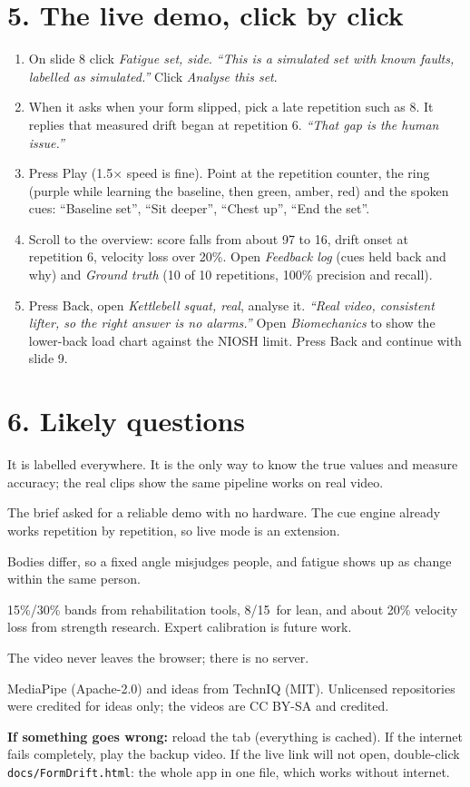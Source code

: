 \documentclass[11pt]{article}
\newcommand{\say}[1]{\textit{``#1''}}
\begin{document}
\section*{5. The live demo, click by click}

\begin{enumerate}
\item On slide 8 click \emph{Fatigue set, side}. \say{This is a simulated set with known faults, labelled as simulated.} Click \emph{Analyse this set}.
\item When it asks when your form slipped, pick a late repetition such as 8. It replies that measured drift began at repetition 6. \say{That gap is the human issue.}
\item Press Play (1.5$\times$ speed is fine). Point at the repetition counter, the ring (purple while learning the baseline, then green, amber, red) and the spoken cues: ``Baseline set'', ``Sit deeper'', ``Chest up'', ``End the set''.
\item Scroll to the overview: score falls from about 97 to 16, drift onset at repetition 6, velocity loss over 20\%. Open \emph{Feedback log} (cues held back and why) and \emph{Ground truth} (10 of 10 repetitions, 100\% precision and recall).
\item Press Back, open \emph{Kettlebell squat, real}, analyse it. \say{Real video, consistent lifter, so the right answer is no alarms.} Open \emph{Biomechanics} to show the lower-back load chart against the NIOSH limit. Press Back and continue with slide 9.
\end{enumerate}

\section*{6. Likely questions}

\begin{description}[style=unboxed,leftmargin=0pt,itemsep=2pt]
\item[Isn't simulated data cheating?] It is labelled everywhere. It is the only way to know the true values and measure accuracy; the real clips show the same pipeline works on real video.
\item[Why not live camera feedback?] The brief asked for a reliable demo with no hardware. The cue engine already works repetition by repetition, so live mode is an extension.
\item[Why a personal baseline?] Bodies differ, so a fixed angle misjudges people, and fatigue shows up as change within the same person.
\item[Where do the thresholds come from?] 15\%/30\% bands from rehabilitation tools, 8\degree/15\degree\ for lean, and about 20\% velocity loss from strength research. Expert calibration is future work.
\item[Privacy?] The video never leaves the browser; there is no server.
\item[What did you reuse?] MediaPipe (Apache-2.0) and ideas from TechnIQ (MIT). Unlicensed repositories were credited for ideas only; the videos are CC BY-SA and credited.
\end{description}

\textbf{If something goes wrong:} reload the tab (everything is cached). If the internet fails completely, play the backup video. If the live link will not open, double-click \texttt{docs/FormDrift.html}: the whole app in one file, which works without internet.
\end{document}
